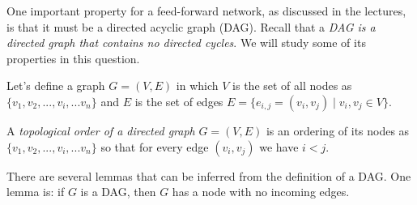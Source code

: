

One important property for a feed-forward network, as discussed in the lectures, is that it must be a directed acyclic graph (DAG). Recall that a \emph{DAG is a directed graph that contains no directed cycles}. We will study some of its properties in this question.

Let's define a graph $G=(V, E)$ in which $V$ is the set of all nodes as $\{v_1, v_2, ..., v_i, ... v_n\}$ and $E$ is the set of 
edges $E = \big\{e_{i,j} = (v_i, v_j) \mid v_i, v_j \in V \big\}$.

A \emph{topological order of a directed graph} $G=(V, E)$ is an ordering of its nodes as $\{v_1, v_2, ..., v_i, ... v_n\}$ so that for every edge $(v_i, v_j)$ we have $i < j$.


There are several lemmas that can be inferred from the definition of a DAG. One lemma is: if $G$ is a DAG, then $G$ has a node with no incoming edges.   

